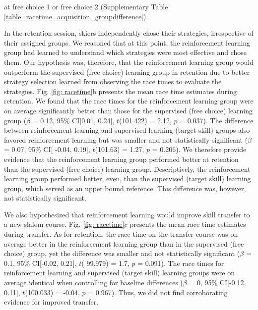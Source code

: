 \documentclass[pdflatex,sn-mathphys-num]{sn-jnl}%
\theoremstyle{thmstyleone}%
\theoremstyle{thmstyletwo}%
\theoremstyle{thmstylethree}%
\begin{document}
at free choice 1 or free choice 2 (Supplementary Table \ref{table_racetime_acquisition_groupdifference}). 

In the retention session, skiers independently chose their strategies, irrespective of their assigned groups. We reasoned that at this point, the reinforcement learning group had learned to understand which strategies were most effective and chose them. Our hypothesis was, therefore, that the reinforcement learning group would outperform the supervised (free choice) learning group in retention due to better strategy selection learned from observing the race times to evaluate the strategies. Fig. \ref{fig: racetime}b presents the mean race time estimates during retention. We found that the race times for the reinforcement learning group were on average significantly better than those for the supervised (free choice) learning group ($\beta$ = 0.12, 95\% CI[0.01, 0.24], $t$(101.422) = 2.12, $p$ = 0.037). The difference between reinforcement learning and supervised learning (target skill) groups also favored reinforcement learning but was smaller and not statistically significant ($\beta$ = 0.07, 95\% CI[ -0.04, 0.19], $t$(101.63) = 1.27, $p$ = 0.206). We therefore provide evidence that the reinforcement learning group performed better at retention than the supervised (free choice) learning group. Descriptively,  the reinforcement learning group performed better, even, than the supervised (target skill) learning group, which served as an upper bound reference. This difference was, however, not statistically significant.

We also hypothesized that reinforcement learning would improve skill transfer to a new slalom course. Fig. \ref{fig: racetime}c presents the mean race time estimates during transfer. As for retention, the race time on the transfer course was on average better in the reinforcement learning group than in the supervised (free choice) group, yet the difference was smaller and not statistically significant ($\beta$ = 0.1, 95\% CI[-0.02, 0.21], $t$( 99.979) = 1.7, $p$  = 0.091). The race times for reinforcement learning and supervised (target skill) learning groups were on average identical when controlling for baseline differences ($\beta$ = 0, 95\% CI[-0.12, 0.11], $t$(100.033) = -0.04, $p$ = 0.967). Thus, we did not find corroborating evidence for improved transfer.
\end{document}
